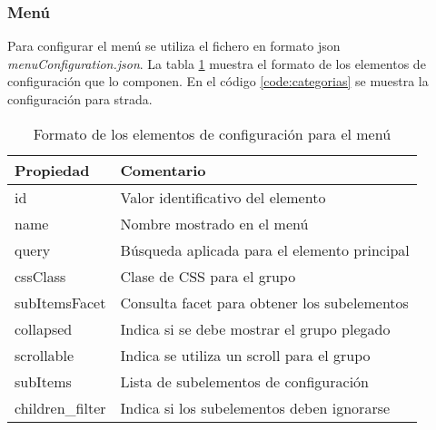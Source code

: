 \subsubsection{Menú}

Para configurar el menú se utiliza el fichero en formato \gls{json} \textit{menuConfiguration.json}. La tabla \ref{table:formatomenu} muestra el formato de los elementos de configuración que lo componen. En el código \ref{code:categorias} se muestra la configuración para \gls{strada}.

\begin{center}
\begin {table}[H]
	\centering
    \begin{tabular}{ | l l |}
    \hline
    \textbf{Propiedad} & \textbf{Comentario} \\ \hline
    id & Valor identificativo del elemento  \\ \hline
    name & Nombre mostrado en el menú  \\ \hline
    query & Búsqueda aplicada para el elemento principal \\ \hline
    cssClass & Clase de CSS para el grupo \\ \hline
    subItemsFacet & Consulta facet para obtener los subelementos \\ \hline
    collapsed & Indica si se debe mostrar el grupo plegado \\ \hline
    scrollable & Indica se utiliza un \gls{scroll} para el grupo \\ \hline
    subItems & Lista de subelementos de configuración \\ \hline
    children\_filter & Indica si los subelementos deben ignorarse \\ \hline
    \end{tabular}
    \caption{Formato de los elementos de configuración para el menú}
    \label{table:formatomenu}
  \end{table}
\end{center}


